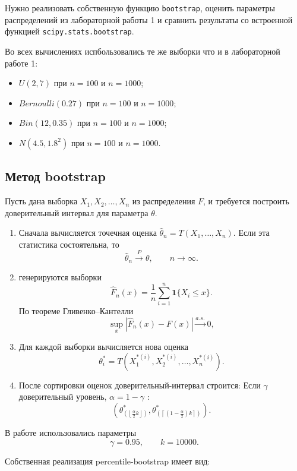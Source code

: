 \documentclass[a4paper,14pt]{extarticle}
\begin{document}
Нужно реализовать собственную функцию \texttt{bootstrap}, оценить параметры распределений из лабораторной работы 1 и сравнить результаты со встроенной функцией \texttt{scipy.stats.bootstrap}.

Во всех вычислениях испбользовались те же выборки что и в лабораторной работе 1:
\begin{itemize}
\item \(U(2,7)\) при \(n=100\) и \(n=1000\);
\item \(Bernoulli(0.27)\) при \(n=100\) и \(n=1000\);
\item \(Bin(12,0.35)\) при \(n=100\) и \(n=1000\);
\item \(N(4.5, 1.8^2)\) при \(n=100\) и \(n=1000\).
\end{itemize}

\subsection{Метод bootstrap}

Пусть дана выборка \(X_1, X_2, \dots, X_n\) из распределения \(F\), и требуется построить доверительный интервал для параметра \(\theta\).

\begin{enumerate}
\item Сначала вычисляется точечная оценка \(\widehat{\theta}_n = T(X_1,\dots,X_n)\). Если эта статистика состоятельна, то
\[
\widehat{\theta}_n \xrightarrow{P} \theta, \qquad n \to \infty.
\]

\item  генерируются выборки  
\[
\widehat{F}_n(x)=\frac{1}{n}\sum_{i=1}^{n}\mathbf{1}\{X_i \le x\}.
\]
По теореме Гливенко--Кантелли
\[
\sup_x |\widehat{F}_n(x)-F(x)| \xrightarrow{a.s.} 0,
\]

\item Для каждой выборки вычисляется нова оценка
\[
\theta_i^* = T(X_1^{*(i)}, X_2^{*(i)}, \dots, X_n^{*(i)}).
\]

\item После сортировки оценок доверительный-интервал строится: Если \(\gamma\)  доверительный уровень, \(\alpha = 1 - \gamma\) :
\[
\left(
\theta^*_{\left(\left\lfloor \frac{\alpha}{2}k \right\rfloor\right)},
\theta^*_{\left(\left\lceil \left(1-\frac{\alpha}{2}\right)k \right\rceil\right)}
\right).
\]
\end{enumerate}

В работе использовались параметры
\[
\gamma = 0.95, \qquad k = 10000.
\]

Собственная реализация percentile-bootstrap имеет вид:
\end{document}
